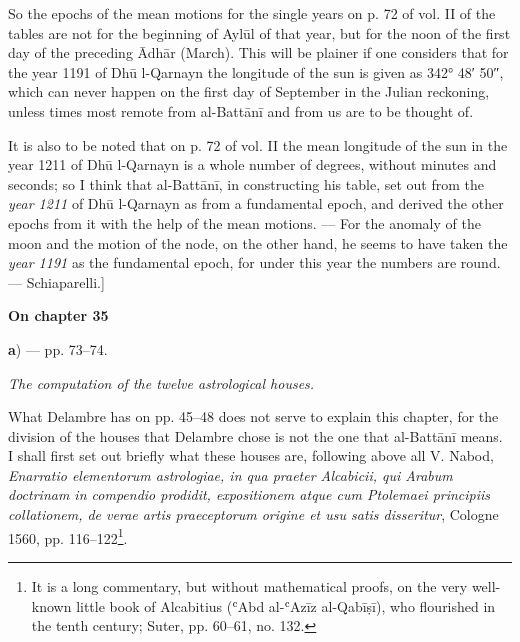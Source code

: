 \documentclass[11pt]{article}
\newcommand{\UnitHead}[2]{\par\setcounter{footnoteT}{0}\needspace{8\baselineskip}\bigskip\pdfbookmark[1]{#1}{unit-#2}\hypertarget{EN-#2}{}%
 {\large\bfseries\interlinepenalty=10000 #1\par}\nobreak\medskip}
\begin{document}
\par So the epochs of the mean motions for the single years on p. 72 of vol. II of the tables are not for the beginning of Aylūl of that year, but for the noon of the first day of the preceding Ādhār (March). This will be plainer if one considers that for the year 1191 of Dhū l-Qarnayn the longitude of the sun is given as 342° 48′ 50″, which can never happen on the first day of September in the Julian reckoning, unless times most remote from al-Battānī and from us are to be thought of.\par
\par It is also to be noted that on p. 72 of vol. II the mean longitude of the sun in the year 1211 of Dhū l-Qarnayn is a whole number of degrees, without minutes and seconds; so I think that al-Battānī, in constructing his table, set out from the \emph{year 1211} of Dhū l-Qarnayn as from a fundamental epoch, and derived the other epochs from it with the help of the mean motions. — For the anomaly of the moon and the motion of the node, on the other hand, he seems to have taken the \emph{year 1191} as the fundamental epoch, for under this year the numbers are round. — Schiaparelli.]\par
\UnitHead{On chapter 35}{A35}
\par\begin{center}\textbf{a}) — pp. 73–74.\end{center}
\par \emph{The computation of the twelve astrological houses.}\par
\par What Delambre has on pp. 45–48 does not serve to explain this chapter, for the division of the houses that Delambre chose is not the one that al-Battānī means. I shall first set out briefly what these houses are, following above all V. Nabod, \emph{Enarratio elementorum astrologiae, in qua praeter Alcabicii, qui Arabum doctrinam in compendio prodidit, expositionem atque cum Ptolemaei principiis collationem, de verae artis praeceptorum origine et usu satis disseritur}, Cologne 1560, pp. 116–122\footnote{It is a long commentary, but without mathematical proofs, on the very well-known little book of Alcabitius (ʿAbd al-ʿAzīz al-Qabīṣī), who flourished in the tenth century; Suter, pp. 60–61, no. 132.}.\par
\end{document}
